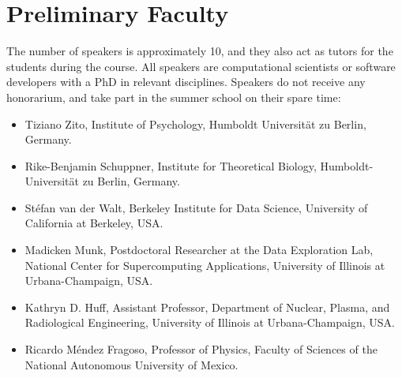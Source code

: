 \documentclass{article}[11pt]
\begin{document}
\section*{Preliminary Faculty}
The number of speakers is approximately 10, and they also act as tutors for
the students during the course. All speakers are computational scientists or
software developers with a PhD in relevant disciplines. Speakers do not
receive any honorarium, and take part in the summer school on their spare time:
\begin{itemize}
\item Tiziano Zito, Institute of Psychology, Humboldt Universit\"at zu Berlin,
Germany.

\item Rike-Benjamin Schuppner, Institute for Theoretical Biology, Humboldt-
Universit\"at zu Berlin, Germany.

\item St\'efan van der Walt, Berkeley Institute for Data Science, University
of California at Berkeley, USA.

\item Madicken Munk, Postdoctoral Researcher at the  Data Exploration Lab,
National Center for Supercomputing Applications, University of Illinois at
Urbana-Champaign, USA.

\item Kathryn D. Huff, Assistant Professor, Department of Nuclear, Plasma, and
Radiological Engineering, University of Illinois at Urbana-Champaign, USA.

\item Ricardo M\'endez Fragoso, Professor of Physics, Faculty of Sciences of
the National Autonomous University of Mexico.
\end{itemize}
\end{document}
